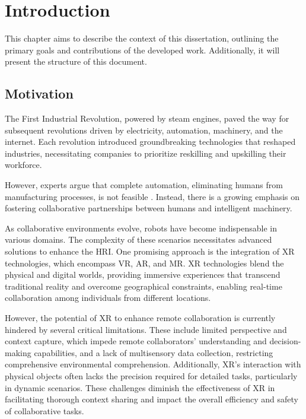 \chapter{Introduction}%
\label{chapter:introduction}

\begin{introduction}
This chapter aims to describe the context of this dissertation, outlining the primary goals and contributions of the developed work. 
Additionally, it will present the structure of this document.
\end{introduction}

\section{Motivation}
\label{section:Motivation}
% 
The First Industrial Revolution, powered by steam engines, paved the way for subsequent revolutions driven by electricity, automation, machinery, 
and the internet. Each revolution introduced groundbreaking technologies that reshaped industries, necessitating companies to prioritize reskilling 
and upskilling their workforce.

However, experts argue that complete automation, eliminating humans from manufacturing processes, is not feasible \cite{Weiss2021}. Instead, there is 
a growing emphasis on fostering collaborative partnerships between humans and intelligent machinery.

As collaborative environments evolve, robots have become indispensable in various domains.
The complexity of these scenarios necessitates advanced solutions to enhance the \ac{HRI}. One promising approach is the integration of \ac{XR} 
technologies, which encompass \ac{VR}, \ac{AR}, and \ac{MR}. \ac{XR} technologies blend the physical and digital worlds, providing immersive 
experiences that transcend traditional reality and overcome geographical constraints, enabling real-time collaboration among individuals from 
different locations.

However, the potential of \ac{XR} to enhance remote collaboration is currently hindered by several critical limitations. These include limited 
perspective and context capture, which impede remote collaborators' understanding and decision-making capabilities, and a lack of multisensory 
data collection, restricting comprehensive environmental comprehension. 
Additionally, \ac{XR}'s interaction with physical objects often lacks the precision required for detailed tasks, particularly in dynamic scenarios. 
These challenges diminish the effectiveness of \ac{XR} in facilitating thorough context sharing and impact the overall efficiency and safety of 
collaborative tasks.

